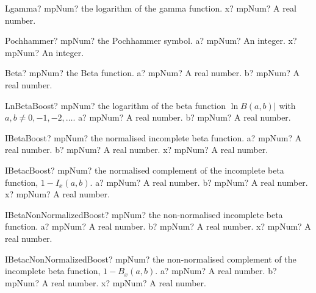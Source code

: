 \documentclass[12pt,a4paper,openany]{book}
\begin{document}
\begin{mpFunctionsExtract}
\mpFunctionOne
{Lgamma? mpNum? the logarithm of the gamma function.}
{x? mpNum? A real number.}
\end{mpFunctionsExtract}

\begin{mpFunctionsExtract}
\mpFunctionTwo
{Pochhammer? mpNum? the Pochhammer symbol.}
{a? mpNum? An integer.}
{x? mpNum? An integer.}
\end{mpFunctionsExtract}

\begin{mpFunctionsExtract}
\mpFunctionTwo
{Beta? mpNum? the Beta function.}
{a? mpNum? A real number.}
{b? mpNum? A real number.}
\end{mpFunctionsExtract}

\begin{mpFunctionsExtract}
\mpFunctionTwo
{LnBetaBoost? mpNum? the logarithm of the beta function $\ln B(a,b)|$ with $a,b \neq 0,-1,-2,\ldots$.}
{a? mpNum? A real number.}
{b? mpNum? A real number.}
\end{mpFunctionsExtract}

\begin{mpFunctionsExtract}
\mpFunctionThree
{IBetaBoost? mpNum? the normalised incomplete beta function.}
{a? mpNum? A real number.}
{b? mpNum? A real number.}
{x? mpNum? A real number.}
\end{mpFunctionsExtract}

\begin{mpFunctionsExtract}
\mpFunctionThree
{IBetacBoost? mpNum? the normalised complement of the incomplete beta function, $1 - I_x(a,b)$.}
{a? mpNum? A real number.}
{b? mpNum? A real number.}
{x? mpNum? A real number.}
\end{mpFunctionsExtract}

\begin{mpFunctionsExtract}
\mpFunctionThree
{IBetaNonNormalizedBoost? mpNum? the non-normalised incomplete beta function.}
{a? mpNum? A real number.}
{b? mpNum? A real number.}
{x? mpNum? A real number.}
\end{mpFunctionsExtract}

\begin{mpFunctionsExtract}
\mpFunctionThree
{IBetacNonNormalizedBoost? mpNum? the non-normalised complement of the incomplete beta function, $1 - B_x(a,b)$.}
{a? mpNum? A real number.}
{b? mpNum? A real number.}
{x? mpNum? A real number.}
\end{mpFunctionsExtract}
\end{document}
